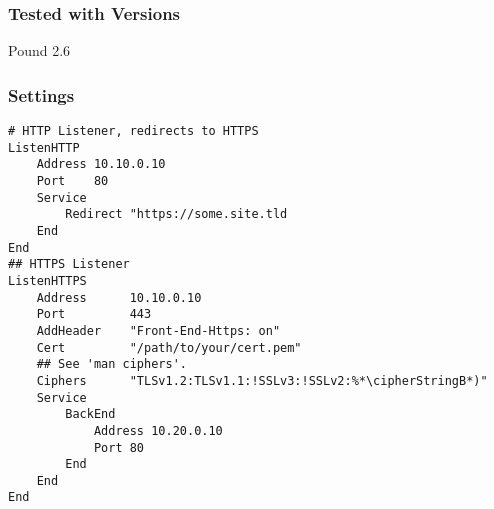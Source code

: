 \subsubsection{Tested with Versions}
\begin{itemize*}
  \item Pound 2.6
\end{itemize*}

\subsubsection{Settings}
\begin{lstlisting}
# HTTP Listener, redirects to HTTPS
ListenHTTP
    Address 10.10.0.10
    Port    80
    Service
        Redirect "https://some.site.tld
    End
End
## HTTPS Listener
ListenHTTPS
    Address      10.10.0.10
    Port         443
    AddHeader    "Front-End-Https: on"
    Cert         "/path/to/your/cert.pem"
    ## See 'man ciphers'.
    Ciphers      "TLSv1.2:TLSv1.1:!SSLv3:!SSLv2:%*\cipherStringB*)"
    Service
        BackEnd
            Address 10.20.0.10
            Port 80
        End
    End
End
\end{lstlisting}

